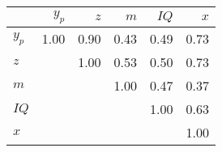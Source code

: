 \begin{tabular}{lrrrrr}
\hline
 & $y_{p}$  & $z$  & $m$  & $IQ$  & $x$  \\ 
\hline
$y_{p}$ & 1.00  & 0.90  & 0.43  & 0.49  & 0.73  \\ 
$z$ &   & 1.00  & 0.53  & 0.50  & 0.73  \\ 
$m$ &   &   & 1.00  & 0.47  & 0.37  \\ 
$IQ$ &   &   &   & 1.00  & 0.63  \\ 
$x$ &   &   &   &   & 1.00  \\ 
\hline
\end{tabular}%
